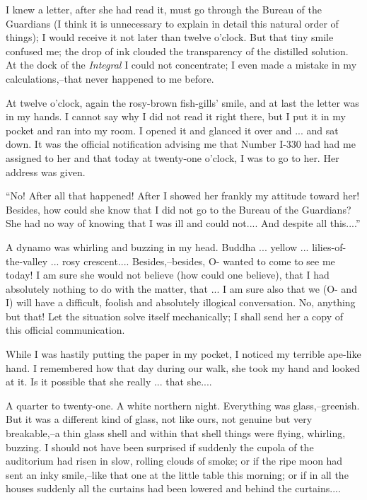 \documentclass[11pt,openany]{book}
\begin{document}
I knew a letter, after she had read it, must go through the Bureau of the Guardians (I think it is unnecessary to explain in detail this natural order of things); I would receive it not later than twelve o'clock. But that tiny smile confused me; the drop of ink clouded the transparency of the distilled solution. At the dock of the \emph{Integral} I could not concentrate; I even made a mistake in my calculations,--that never happened to me before.

At twelve o'clock, again the rosy-brown fish-gills' smile, and at last the letter was in my hands. I cannot say why I did not read it right there, but I put it in my pocket and ran into my room. I opened it and glanced it over and ... and sat down. It was the official notification advising me that Number I-330 had had me assigned to her and that today at twenty-one o'clock, I was to go to her. Her address was given.

``No! After all that happened! After I showed her frankly my attitude toward her! Besides, how could she know that I did not go to the Bureau of the Guardians? She had no way of knowing that I was ill and could not.... And despite all this....''

A dynamo was whirling and buzzing in my head. Buddha ... yellow ... lilies-of-the-valley ... rosy crescent.... Besides,--besides, O- wanted to come to see me today! I am sure she would not believe (how could one believe), that I had absolutely nothing to do with the matter, that ... I am sure also that we (O- and I) will have a difficult, foolish and absolutely illogical conversation. No, anything but that! Let the situation solve itself mechanically; I shall send her a copy of this official communication.

While I was hastily putting the paper in my pocket, I noticed my terrible ape-like hand. I remembered how that day during our walk, she took my hand and looked at it. Is it possible that she really ... that she....

A quarter to twenty-one. A white northern night. Everything was glass,--greenish. But it was a different kind of glass, not like ours, not genuine but very breakable,--a thin glass shell and within that shell things were flying, whirling, buzzing. I should not have been surprised if suddenly the cupola of the auditorium had risen in slow, rolling clouds of smoke; or if the ripe moon had sent an inky smile,--like that one at the little table this morning; or if in all the houses suddenly all the curtains had been lowered and behind the curtains....
\end{document}
